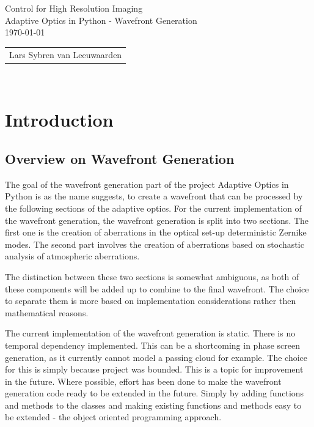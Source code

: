 \documentclass{article}
\begin{document}
\begin{titlepage}
  \begin{center}
   { \Huge Control for High Resolution Imaging} \\ 
   { \Large Adaptive Optics in Python - Wavefront Generation} \\   
   \vfill
   \today \\[1em]
   
   \begin{tabular}{c}
    Lars Sybren van Leeuwaarden\\
   \end{tabular}\\
  \end{center}
 \end{titlepage}
 
\tableofcontents

\newpage

\section{Introduction}
\subsection{Overview on Wavefront Generation}
The goal of the wavefront generation part of the project Adaptive Optics in Python is as the name suggests, to create a wavefront that can be processed by the following sections of the adaptive optics. For the current implementation of the wavefront generation, the wavefront generation is split into two sections. The first one is the creation of aberrations in the optical set-up deterministic Zernike modes. The second part involves the creation of aberrations based on stochastic analysis of atmospheric aberrations. 

The distinction between these two sections is somewhat ambiguous, as both of these components will be added up to combine to the final wavefront. The choice to separate them is more based on implementation considerations rather then mathematical reasons. 

The current implementation of the wavefront generation is static. There is no temporal dependency implemented. This can be a shortcoming in phase screen generation, as it currently cannot model a passing cloud for example. The choice for this is simply because project was bounded. This is a topic for improvement in the future. Where possible, effort has been done to make the wavefront generation code ready to be extended in the future. Simply by adding functions and methods to the classes and making existing functions and methods easy to be extended - the object oriented programming approach. 
\end{document}
